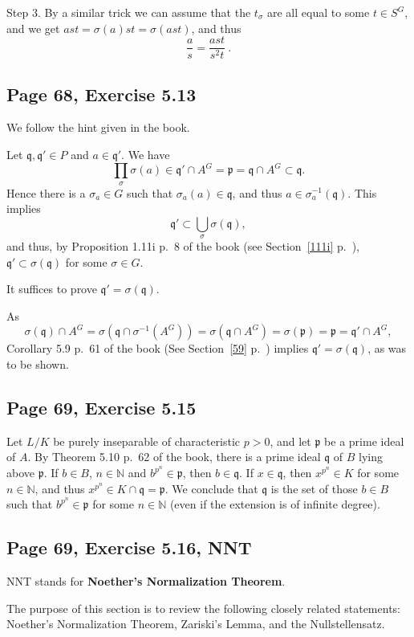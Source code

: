 \documentclass[parskip=half,fontsize=12pt]{scrartcl}%
\newcommand{\mf}{\mathfrak}
\newcommand{\ppp}{\mf p}
\newcommand{\qqq}{\mf q}
\begin{document}
Step 3. By a similar trick we can assume that the $t_\sigma$ are all equal to some $t\in S^G$, and we get $ast=\sigma(a)st=\sigma(ast)$, and thus 
$$
\frac{a}{s}=\frac{ast}{s^2t}\ .
$$
\subsection{Page 68, Exercise 5.13}%

We follow the hint given in the book.

Let $\qqq,\qqq'\in P$ and $a\in\qqq'$. We have  
$$
\prod_\sigma\sigma(a)\in\qqq'\cap A^G=\ppp=\qqq\cap A^G\subset\qqq.
$$ 
Hence there is a $\sigma_a\in G$ such that $\sigma_a(a)\in\qqq$, and thus $a\in\sigma_a^{-1}(\qqq)$. This implies 
$$
\qqq'\subset\bigcup_\sigma\sigma(\qqq),
$$ 
and thus, by Proposition 1.11i p.~8 of the book (see Section~\ref{111i} p.~\pageref{111i}), $\qqq'\subset\sigma(\qqq)$ for some $\sigma\in G$. 

It suffices to prove $\qqq'=\sigma(\qqq)$.

As 
$$
\sigma(\qqq)\cap A^G=\sigma\left(\qqq\cap\sigma^{-1}(A^G)\right)=\sigma\left(\qqq\cap A^G\right)=\sigma(\ppp)=\ppp=\qqq'\cap A^G,
$$ 
Corollary 5.9 p.~61 of the book (See Section~\ref{59} p.~\pageref{59}) implies $\qqq'=\sigma(\qqq)$, as was to be shown.

\subsection{Page 69, Exercise 5.15}%

Let $L/K$ be purely inseparable of characteristic $p>0$, and let $\ppp$ be a prime ideal of $A$. By Theorem 5.10 p.~62 of the book, there is a prime ideal $\qqq$ of $B$ lying above $\ppp$. If $b\in B$, $n\in\mathbb N$ and $b^{p^n}\in\ppp$, then $b\in\qqq$. If $x\in\qqq$, then $x^{p^n}\in K$ for some $n\in\mathbb N$, and thus $x^{p^n}\in K\cap\qqq=\ppp$. We conclude that $\qqq$ is the set of those $b\in B$ such that $b^{p^n}\in\ppp$ for some $n\in\mathbb N$ (even if the extension is of infinite degree).

\subsection{Page 69, Exercise 5.16, NNT}\label{nnt}%

NNT stands for \textbf{Noether's Normalization Theorem}.

The purpose of this section is to review the following closely related statements: Noether's Normalization Theorem, Zariski's Lemma, %
and the Nullstellensatz.
\end{document}
